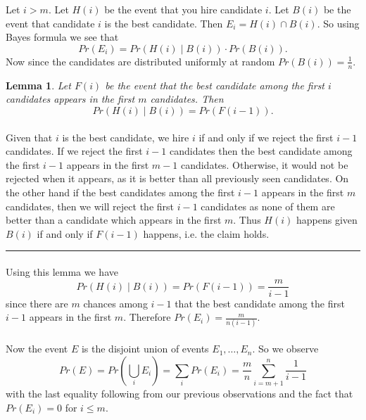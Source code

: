 \documentclass[letterpaper,12pt,oneside,onecolumn]{article}
\newenvironment{proof}{{\bf Proof:  }}{\hfill\rule{2mm}{2mm}}
\newtheorem{lemma}[fact]{Lemma}
\begin{document}
\newpage
\section{}
\paragraph{}
Let $i > m$. Let $H(i)$ be the event that you hire candidate $i$. Let $B(i)$ be the event that candidate $i$ is the best candidate. Then $E_i = H(i) \cap B(i)$. So using Bayes formula we see that
$$Pr(E_i) = Pr(H(i) \mid B(i)) \cdot Pr(B(i)).$$
Now since the candidates are distributed uniformly at random $Pr(B(i)) = \frac{1}{n}$.
\begin{lemma}
	Let $F(i)$ be the event that the best candidate among the first $i$ candidates appears in the first $m$ candidates. Then
	$$Pr(H(i) \mid B(i)) = Pr(F(i-1)).$$
\end{lemma}
\begin{proof}
	\paragraph{}
	Given that $i$ is the best candidate, we hire $i$ if and only if we reject the first $i-1$ candidates. If we reject the first $i-1$ candidates then the best candidate among the first $i-1$ appears in the first $m-1$ candidates. Otherwise, it would not be rejected when it appears, as it is better than all previously seen candidates. On the other hand if the best candidates among the first $i-1$ appears in the first $m$ candidates, then we will reject the first $i-1$ candidates as none of them are better than a candidate which appears in the first $m$. Thus $H(i)$ happens given $B(i)$ if and only if $F(i-1)$ happens, i.e. the claim holds.
\end{proof}
\paragraph{}
Using this lemma we have
$$Pr(H(i) \mid B(i)) = Pr(F(i-1)) = \frac{m}{i-1}$$
since there are $m$ chances among $i-1$ that the best candidate among the first $i-1$ appears in the first $m$.
Therefore $Pr(E_i) = \frac{m}{n(i-1)}$.
\paragraph{}
Now the event $E$ is the disjoint union of events $E_1, \dots, E_n$. So we observe 
$$Pr(E) = Pr(\bigcup_{i} E_i) = \sum_{i} Pr(E_i) = \frac{m}{n}\sum_{i=m+1}^n \frac{1}{i-1}$$
with the last equality following from our previous observations and the fact that $Pr(E_i) = 0$ for $i \leq m$.
\end{document}
